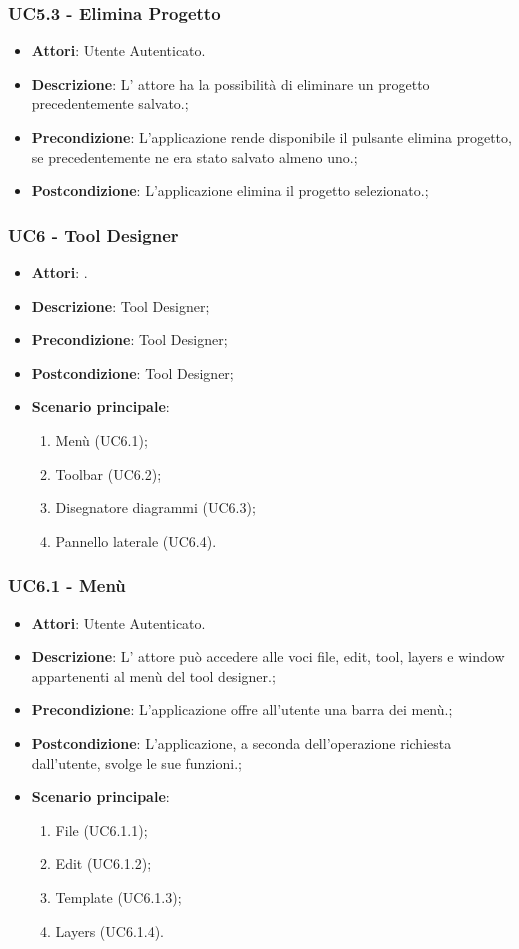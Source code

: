 \subsubsection{UC5.3 - Elimina Progetto} 
\label{sssec:UC5.3} 
\begin{itemize} 
\item \textbf{Attori}: Utente Autenticato.
\item \textbf{Descrizione}: L' attore ha la possibilità di eliminare un progetto precedentemente salvato.;
\item \textbf{Precondizione}: L’applicazione rende disponibile il pulsante elimina progetto, se precedentemente ne era stato salvato almeno uno.;
\item \textbf{Postcondizione}: L’applicazione elimina il progetto selezionato.;
\end{itemize} 
\subsubsection{UC6 - Tool Designer} 
\label{sssec:UC6} 
\begin{itemize} 
\item \textbf{Attori}: .
\item \textbf{Descrizione}: Tool Designer;
\item \textbf{Precondizione}: Tool Designer;
\item \textbf{Postcondizione}: Tool Designer;
\item \textbf{Scenario principale}: \begin{enumerate}\item Menù (UC6.1);\item Toolbar (UC6.2);\item Disegnatore diagrammi (UC6.3);\item Pannello laterale (UC6.4). 
 \end{enumerate}
\end{itemize} 
\subsubsection{UC6.1 - Menù} 
\label{sssec:UC6.1} 
\begin{itemize} 
\item \textbf{Attori}: Utente Autenticato.
\item \textbf{Descrizione}: L’ attore può accedere alle voci file, edit, tool,
layers e window appartenenti al menù del tool designer.;
\item \textbf{Precondizione}: L’applicazione offre all’utente una barra dei menù.;
\item \textbf{Postcondizione}: L’applicazione, a seconda dell’operazione richiesta dall’utente,
svolge le sue funzioni.;
\item \textbf{Scenario principale}: \begin{enumerate}\item File (UC6.1.1);\item Edit (UC6.1.2);\item Template (UC6.1.3);\item Layers (UC6.1.4). 
 \end{enumerate}
\end{itemize} 
